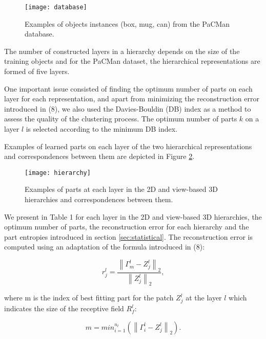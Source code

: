 \documentclass[runningheads]{llncs}
\begin{document}
\begin{figure}
\begin{center}
\texttt{[image: database]}
\end{center}
\caption{Examples of objects instances (box, mug, can) from the PaCMan database.}
\label{database}
\end{figure}

The number of constructed layers in a hierarchy depends on the size of the training objects and for the PaCMan dataset, the hierarchical representations are formed of five layers. 

One important issue consisted of finding the optimum number of parts on each layer for each representation, and apart from minimizing the reconstruction error introduced in (8), we also used the Davies-Bouldin (DB) index \cite{Bouldin97} as a method to assess the quality of the clustering process. The optimum number of parts $k$ on a layer $l$ is selected according to the minimum DB index.

Examples of learned parts on each layer of the two hierarchical representations and correspondences between them are depicted in Figure \ref{hierarchy}.

\begin{figure}
\begin{center}
\texttt{[image: hierarchy]}
\end{center}
\caption{Examples of parts at each layer in the 2D and view-based 3D hierarchies and correspondences between them.}
\label{hierarchy}
\end{figure}

We present in Table 1 for each layer in the 2D and view-based 3D hierarchies, the optimum number of parts, the reconstruction error for each hierarchy and the part entropies introduced in section \ref{sec:statistical}. The reconstruction error is computed using an adaptation of the formula introduced in (8):

\begin{equation}
 r_j^l = \frac{\left\|\Gamma_m^l-Z_j^l\right\|_2}{\left\|Z_j^l\right\|_2}, \end{equation}
 
 where m is the index of best fitting part for the patch $Z_j^l$ at the layer $l$ which indicates the size of the receptive field $R_f^l$:
 
\begin{equation}
 m=min_{i=1}^{n_l}(\left\|\Gamma_i^l-Z_j^l\right\|_2).
\end{equation}
\end{document}
